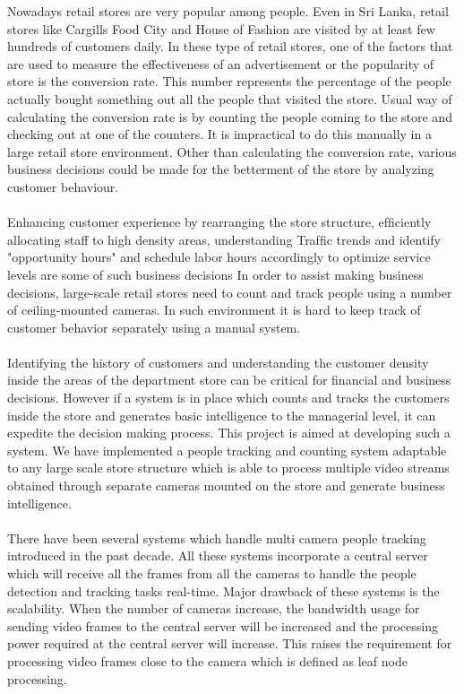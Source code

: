 \documentclass[12pt,a4paper]{report}
\begin{document}
Nowadays retail stores are very popular among people. Even in Sri Lanka, retail stores like Cargills Food City and House of Fashion are visited by at least few hundreds of customers daily. In these type of retail stores, one of the factors that are used to measure the effectiveness of an advertisement or the popularity of store is the conversion rate. This number represents the percentage of the people actually bought something out all the people that visited the store. Usual way of calculating the conversion rate is by counting the people coming to the store and checking out at one of the counters. It is impractical to do this manually in a large retail store environment. Other than calculating the conversion rate, various business decisions could be made for the betterment of the store by analyzing customer behaviour. \\\\
Enhancing customer experience by rearranging the store structure, efﬁciently allocating staff to high density areas, understanding Trafﬁc trends and identify "opportunity hours" and schedule labor hours accordingly to optimize service levels are some of such business decisions In order to assist making business decisions, large-scale retail stores need to count and track people using a number of ceiling-mounted cameras. In such environment it is hard to keep track of customer behavior separately using a manual system.\\\\
Identifying the history of  customers and understanding the customer density inside the areas of the department store can be critical for ﬁnancial and business decisions. However if a system is in place which counts and tracks the customers inside the store and generates basic intelligence to the managerial level, it can expedite the decision making process. This project is aimed at developing such a system. We have implemented a people tracking and counting system adaptable to any large scale store structure which is able to process multiple video streams obtained through separate cameras mounted on the store and generate business intelligence.\\\\
There have been several systems which handle multi camera people tracking introduced in the past decade. All these systems incorporate a central server which will receive all the frames from all the cameras to handle the people detection and tracking tasks real-time. Major drawback of these systems is the scalability. When the number of cameras increase, the bandwidth usage for sending video frames to the central server will be increased and the processing power required at the central server will increase. This raises the requirement for processing video frames close to the camera which is defined as leaf node processing. \\\\
\end{document}
